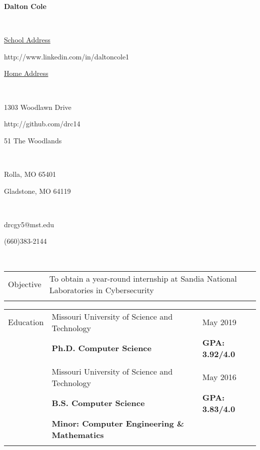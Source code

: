 \documentclass[10.5pt, arial]{article}
\newcommand\textbox[1]{%
  \parbox{.333\textwidth}{#1}%
}
\begin{document}

\noindent\textbox{\hfill}\textbox{\hfil \textbf{Dalton Cole}\hfil}\textbox{\hfill} \\
\noindent\textbox{\underline{School Address}\hfill}\textbox{\hfil http://www.linkedin.com/in/daltoncole1\hfil}\textbox{\hfill \underline{Home Address}} \\
\noindent\textbox{1303 Woodlawn Drive\hfill}\textbox{\hfil http://github.com/drc14\hfil}\textbox{\hfill 51 The Woodlands} \\
\noindent\textbox{Rolla, MO 65401\hfill}\textbox{\hfil \hfil}\textbox{\hfill Gladstone, MO 64119} \\
\noindent\textbox{drcgy5@mst.edu\hfill}\textbox{\hfil \hfil}\textbox{\hfill (660)383-2144} \\
\noindent\makebox[\linewidth]{\rule{\textwidth}{.4pt}} 

\begin{tabular}{p{1.5cm} p{13.2cm} l}
Objective  	& To obtain a year-round internship at Sandia National Laboratories in Cybersecurity 	& 						\\ \\
\end{tabular}

\begin{tabular}{p{1.5cm} p{13.2cm} l}
Education  	& Missouri University of Science and Technology 					& May 2019 				\\
			& \textbf{Ph.D. Computer Science} 									& \textbf{GPA: 3.92/4.0}	\\ \\

		  	& Missouri University of Science and Technology 					& May 2016 				\\
			& \textbf{B.S. Computer Science} 									& \textbf{GPA: 3.83/4.0} \\
			& \textbf{Minor: Computer Engineering \& Mathematics} 										\\ \\
\end{tabular}
\end{document}
